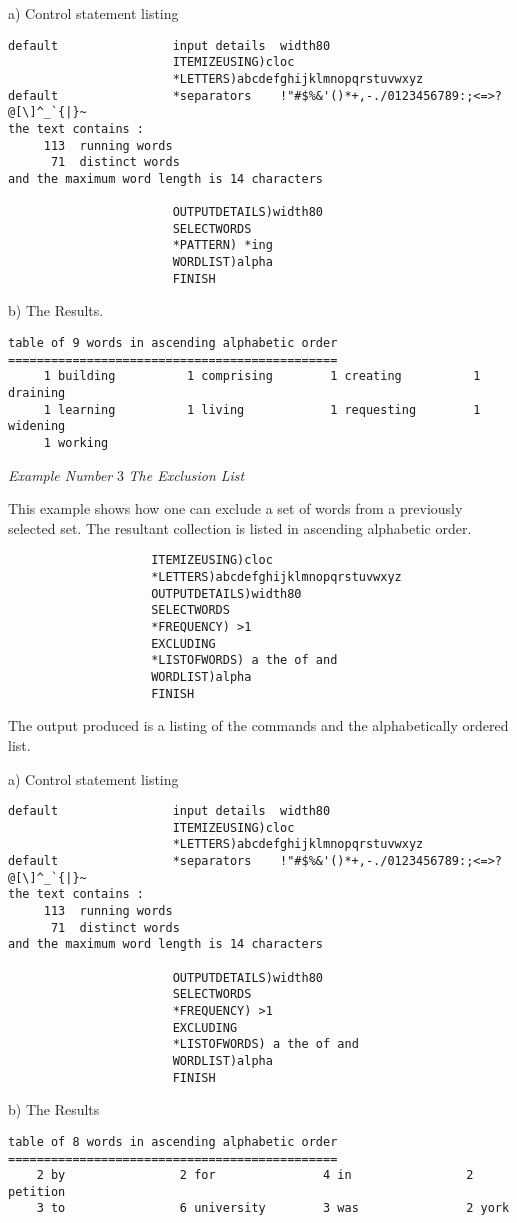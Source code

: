                      a)  Control statement listing
\begin{verbatim}
default                input details  width80
                       ITEMIZEUSING)cloc
                       *LETTERS)abcdefghijklmnopqrstuvwxyz
default                *separators    !"#$%&'()*+,-./0123456789:;<=>?@[\]^_`{|}~
the text contains :
     113  running words
      71  distinct words
and the maximum word length is 14 characters

                       OUTPUTDETAILS)width80
                       SELECTWORDS
                       *PATTERN) *ing
                       WORDLIST)alpha
                       FINISH

\end{verbatim}
                      b)   The Results.
\begin{verbatim}
table of 9 words in ascending alphabetic order
==============================================
     1 building          1 comprising        1 creating          1 draining
     1 learning          1 living            1 requesting        1 widening
     1 working
\end{verbatim}

\newpage
 {\em Example Number} 3                      {\em The Exclusion List}

 This example shows how one can exclude a set of words from a previously
 selected set.  The resultant collection is listed in ascending alphabetic
 order.
\begin{verbatim}
                    ITEMIZEUSING)cloc
                    *LETTERS)abcdefghijklmnopqrstuvwxyz
                    OUTPUTDETAILS)width80
                    SELECTWORDS
                    *FREQUENCY) >1
                    EXCLUDING
                    *LISTOFWORDS) a the of and
                    WORDLIST)alpha
                    FINISH
\end{verbatim}
    The output produced is a listing of the commands and the alphabetically
    ordered list.

                     a)   Control statement listing
\begin{verbatim}
default                input details  width80
                       ITEMIZEUSING)cloc
                       *LETTERS)abcdefghijklmnopqrstuvwxyz
default                *separators    !"#$%&'()*+,-./0123456789:;<=>?@[\]^_`{|}~
the text contains :
     113  running words
      71  distinct words
and the maximum word length is 14 characters

                       OUTPUTDETAILS)width80
                       SELECTWORDS
                       *FREQUENCY) >1
                       EXCLUDING
                       *LISTOFWORDS) a the of and
                       WORDLIST)alpha
                       FINISH

\end{verbatim}
                    b)  The Results
\begin{verbatim}
table of 8 words in ascending alphabetic order
==============================================
    2 by                2 for               4 in                2 petition
    3 to                6 university        3 was               2 york
\end{verbatim}

